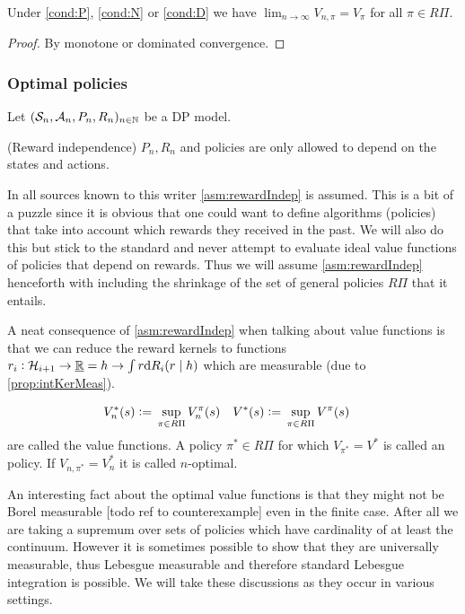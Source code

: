 \begin{prop}
  Under \cref{cond:P}, \cref{cond:N} or \cref{cond:D} we have
  $\lim_{n\to\infty} V_{n, \pi} = V_\pi $
  for all $\pi \in R\Pi$.
\end{prop}
\begin{proof}
  By monotone or dominated convergence.
\end{proof}

\subsubsection{Optimal policies}

Let $(\mathcal{S}_n, \mathcal{A}_n, P_n, R_n)_{n \in \mathbb{N}}$ be a DP model.

\begin{asm}(Reward independence)
  $P_n, R_n$ and policies are only allowed to depend on the
  states and actions.
  \label{asm:rewardIndep}
\end{asm}

In all sources known to this writer \cref{asm:rewardIndep} is assumed.
This is a bit of a puzzle since it is obvious that one could
want to define algorithms (policies) that take into account which rewards
they received in the past.
We will also do this but stick to the standard and 
never attempt to evaluate ideal value functions of
policies that depend on rewards.
Thus we will assume \cref{asm:rewardIndep} henceforth with including the
shrinkage of the set of general policies $R\Pi$ that it entails.

A neat consequence of \cref{asm:rewardIndep} when talking about
value functions is that we can reduce the reward kernels to functions
$r_i : \mathcal{H}_{i+1} \to \underline{\mathbb{R}} = h \to \int r \mathrm{d} R_i(r \mid h)$
which are measurable (due to \cref{prop:intKerMeas}).

\begin{defn} 
  \begin{align*}
    V_n^*(s) \vcentcolon= & \; \sup_{\pi \in R\Pi} V_n^\pi(s) &
    V^*(s) \vcentcolon= & \; \sup_{\pi \in R\Pi} V^\pi(s)
  \end{align*}
  are called the  value functions.
  A policy $\pi^* \in R\Pi$ for which $V_{\pi^*} = V^*$ is called an
   policy.
  If $V_{n, \pi^*} = V^*_n$ it is called $n$-optimal.
\end{defn}

An interesting fact about the optimal value functions is that they
might not be Borel measurable [todo ref to counterexample]
even in the finite case.
After all we are taking a supremum over
sets of policies which have cardinality of at least the continuum.
However it is sometimes possible to show that they are
universally measurable, thus Lebesgue measurable and therefore
standard Lebesgue integration is possible.
We will take these discussions as they occur in various settings.

